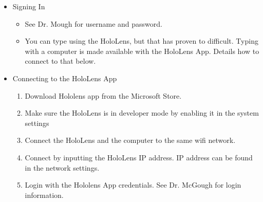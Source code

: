 \begin{itemize}
    \item Signing In
        \begin{itemize}
            \item See Dr. Mough for username and password. 

            \item You can type using the HoloLens, but that has proven to difficult. Typing with a computer is made available with the HoloLens App. Details how to connect to that below.
        \end{itemize}

    \item Connecting to the HoloLens App
        \begin{enumerate}
            \item Download Hololens app from the Microsoft Store.
            \item Make sure the HoloLens is in developer mode by enabling it in the system settings
            \item Connect the HoloLens and the computer to the same wifi network.
            \item Connect by inputting the HoloLens IP address. IP address can be found in the network settings.
            \item Login with the Hololens App credentials. See Dr. McGough for login information.
        \end{enumerate}

\end{itemize}



